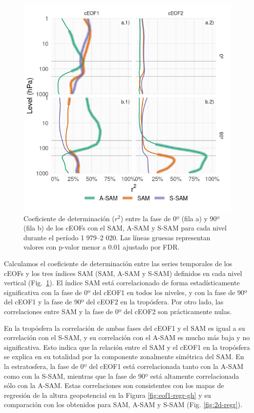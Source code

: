 \documentclass[12pt,oneside,a4paper]{reedthesis}
\begin{document}
\begin{figure}

{\centering \includegraphics{figures/30-sam/sam-eof-vertical-1} 

}

\caption{Coeficiente de determinación (\(r^2\)) entre la fase de 0º (fila a) y 90º (fila b) de los cEOFs con el SAM, A-SAM y S-SAM para cada nivel durante el período 1 979--2 020. Las líneas gruesas representan valores con p-valor menor a 0.01 ajustado por FDR.}\label{fig:sam-eof-vertical}
\end{figure}

Calculamos el coeficiente de determinación entre las series temporales de los cEOFs y los tres índices SAM (SAM, A-SAM y S-SAM) definidos en cada nivel vertical (Fig.~\ref{fig:sam-eof-vertical}).
El índice SAM está correlacionado de forma estadísticamente significativa con la fase de 0º del cEOF1 en todos los niveles, y con la fase de 90º del cEOF1 y la fase de 90º del cEOF2 en la tropósfera.
Por otro lado, las correlaciones entre SAM y la fase de 0º del cEOF2 son prácticamente nulas.

En la tropósfera la correlación de ambas fases del cEOF1 y el SAM es igual a su correlación con el S-SAM, y su correlación con el A-SAM es mucho más baja y no significativa.
Esto indica que la relación entre el SAM y el cEOF1 en la tropósfera se explica en su totalidad por la componente zonalmente simétrica del SAM.
En la estratosfera, la fase de 0º del cEOF1 está correlacionada tanto con la A-SAM como con la S-SAM, mientras que la fase de 90º está altamente correlacionada sólo con la A-SAM.
Estas correlaciones son consistentes con los mapas de regresión de la altura geopotencial en la Figura \ref{fig:eof1-regr-gh} y su comparación con los obtenidos para SAM, A-SAM y S-SAM (Fig. \ref{fig:2d-regr}).
\end{document}
